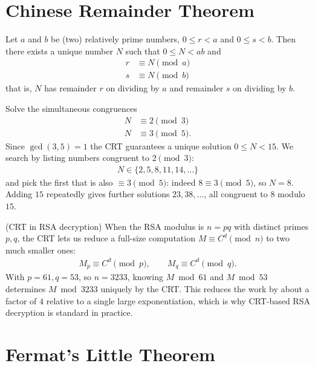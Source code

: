 \documentclass[a4paper, 12pt]{book} %
\begin{document}
\section{Chinese Remainder Theorem}

\begin{theorem}
    Let $a$ and $b$ be (two) relatively prime numbers, $0 \leq r < a$ and $0 \leq s < b$. Then there exists a unique number $N$ such that $0 \leq N < ab$ and 
    \begin{align}
        r &\equiv N \pmod a \\
        s &\equiv N \pmod b
    \end{align}
    that is, $N$ has remainder $r$ on dividing by $a$ and remainder $s$ on dividing by $b$.
\end{theorem}

\begin{example}
    Solve the simultaneous congruences
    \begin{align}
        N &\equiv 2 \pmod 3 \\
        N &\equiv 3 \pmod 5.
    \end{align}
    Since $\gcd(3,5) = 1$ the CRT guarantees a unique solution $0 \le N < 15$. We search by listing numbers congruent to $2 \pmod 3$:
    \begin{align}
        N \in \{2, 5, 8, 11, 14, \ldots\}
    \end{align}
    and pick the first that is also $\equiv 3 \pmod 5$: indeed $8 \equiv 3 \pmod 5$, so $N = 8$. Adding $15$ repeatedly gives further solutions $23, 38, \ldots$, all congruent to $8$ modulo $15$.
\end{example}

\begin{example}
    (CRT in RSA decryption) When the RSA modulus is $n = pq$ with distinct primes $p, q$, the CRT lets us reduce a full-size computation $M \equiv C^d \pmod n$ to two much smaller ones:
    \begin{align}
        M_p \equiv C^d \pmod p, \qquad M_q \equiv C^d \pmod q.
    \end{align}
    With $p = 61, q = 53$, so $n = 3233$, knowing $M \bmod 61$ and $M \bmod 53$ determines $M \bmod 3233$ uniquely by the CRT. This reduces the work by about a factor of $4$ relative to a single large exponentiation, which is why CRT-based RSA decryption is standard in practice.
\end{example}


\section{Fermat's Little Theorem}
\end{document}
